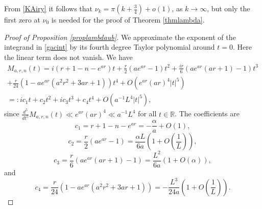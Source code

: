 \documentclass[11pt]{amsart}
\begin{document}
From \eqref{KAiry} it follows that $\nu_k = \pi \left(k + \frac{3}{4}\right) +o(1)$, as  $k\to \infty$, but only the first zero at $\nu_0$ is needed for the proof of Theorem \ref{thmlambda}.

\begin{proof}[Proof of Proposition \ref{proplambdaub}]
We approximate the exponent of the integrand in \eqref{gacint} by its fourth degree Taylor polynomial around $t=0$.
Here the linear term does not vanish.
We have
\begin{multline*}
M_{a,r,n}(t) = i  \left(r+1-n-e^{ar}\right)t
+\frac{r}{2}  \left(a e^{a r}-1\right) t^2
+ \frac{i r}{6} \left(a  e^{a r} (a r+1)-1\right) t^3 \\
+ \frac{r}{24}\left(1-a  e^{a r} \left(a^2 r^2+3 a r+1\right)\right) t^4 
+O(e^{ar} (ar)^4 |t|^5) \\
=: ic_1 t+ c_{2} t^2+ i  c_{3} t^3+  c_{4} t^4 +O( a^{-1} L^4 |t|^5),
\end{multline*}
since $\frac{d^5}{dt^5} M_{a,r,n}(t) \ll e^{ar} (ar)^4 \ll a^{-1} L^4$ for all $t\in \mathbb{R}$.
The coefficients are
$$
c_1 = r+1-n-e^{ar}= -\frac{\alpha}{a} +O(1),
$$
$$
c_2= \frac{r}{2}  \left(a e^{a r}-1\right)
=\frac{\alpha L}{6a}\left(1+O\left(\frac{1}{L}\right)\right),
$$
$$
c_3= \frac{r}{6} \left(a  e^{a r} (a r+1)-1\right) = \frac{L^2}{6a} ( 1+ O(\alpha)),
$$
and
$$
c_4 =  \frac{r}{24}\left(1-a  e^{a r} \left(a^2 r^2+3 a r+1\right)\right) = -\frac{L^3}{24 a} \left(1+O\left(\frac{1}{L}\right)\right).
$$


\end{proof}
\end{document}
